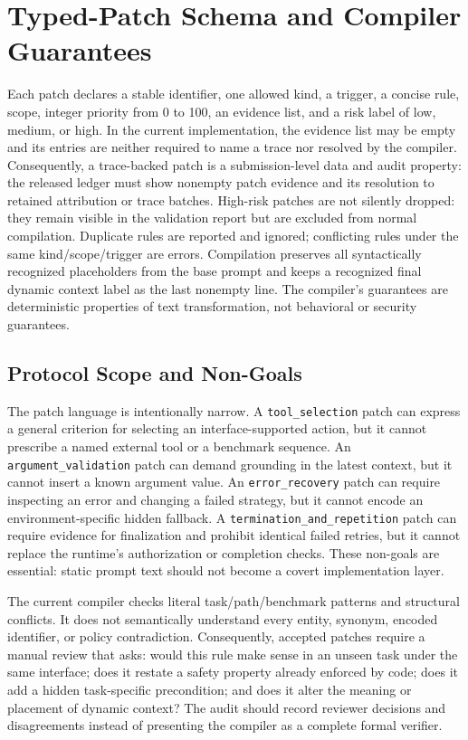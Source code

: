 \documentclass[10pt]{article}
\begin{document}
\section{Typed-Patch Schema and Compiler Guarantees}
Each patch declares a stable identifier, one allowed kind, a trigger, a concise rule, scope, integer priority from 0 to 100, an evidence list, and a risk label of low, medium, or high. In the current implementation, the evidence list may be empty and its entries are neither required to name a trace nor resolved by the compiler. Consequently, a trace-backed patch is a submission-level data and audit property: the released ledger must show nonempty patch evidence and its resolution to retained attribution or trace batches. High-risk patches are not silently dropped: they remain visible in the validation report but are excluded from normal compilation. Duplicate rules are reported and ignored; conflicting rules under the same kind/scope/trigger are errors. Compilation preserves all syntactically recognized placeholders from the base prompt and keeps a recognized final dynamic context label as the last nonempty line. The compiler's guarantees are deterministic properties of text transformation, not behavioral or security guarantees.

\subsection{Protocol Scope and Non-Goals}
The patch language is intentionally narrow. A \texttt{tool\_selection} patch can express a general criterion for selecting an interface-supported action, but it cannot prescribe a named external tool or a benchmark sequence. An \texttt{argument\_validation} patch can demand grounding in the latest context, but it cannot insert a known argument value. An \texttt{error\_recovery} patch can require inspecting an error and changing a failed strategy, but it cannot encode an environment-specific hidden fallback. A \texttt{termination\_and\_repetition} patch can require evidence for finalization and prohibit identical failed retries, but it cannot replace the runtime's authorization or completion checks. These non-goals are essential: static prompt text should not become a covert implementation layer.

The current compiler checks literal task/path/benchmark patterns and structural conflicts. It does not semantically understand every entity, synonym, encoded identifier, or policy contradiction. Consequently, accepted patches require a manual review that asks: would this rule make sense in an unseen task under the same interface; does it restate a safety property already enforced by code; does it add a hidden task-specific precondition; and does it alter the meaning or placement of dynamic context? The audit should record reviewer decisions and disagreements instead of presenting the compiler as a complete formal verifier.
\end{document}
